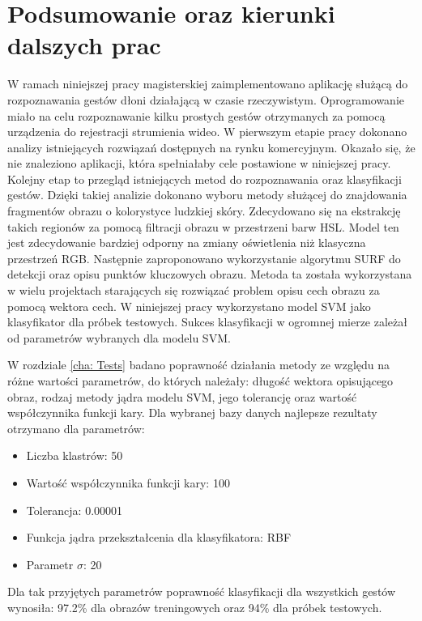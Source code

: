 \chapter{Podsumowanie oraz kierunki dalszych prac}
W ramach niniejszej pracy magisterskiej zaimplementowano aplikację służącą do rozpoznawania gestów dłoni działającą w czasie rzeczywistym. Oprogramowanie miało na celu rozpoznawanie kilku prostych gestów otrzymanych za pomocą urządzenia do rejestracji strumienia wideo. W pierwszym etapie pracy dokonano analizy istniejących rozwiązań dostępnych na rynku komercyjnym. Okazało się, że nie znaleziono aplikacji, która spełniałaby cele postawione w niniejszej pracy. Kolejny etap to przegląd istniejących metod do rozpoznawania oraz klasyfikacji gestów. Dzięki takiej analizie dokonano wyboru metody służącej do znajdowania fragmentów obrazu o kolorystyce ludzkiej skóry. Zdecydowano się na ekstrakcję takich regionów za pomocą filtracji obrazu w przestrzeni barw HSL. Model ten jest zdecydowanie bardziej odporny na zmiany oświetlenia niż klasyczna przestrzeń RGB. Następnie zaproponowano wykorzystanie algorytmu SURF do detekcji oraz opisu punktów kluczowych obrazu. Metoda ta została wykorzystana w wielu projektach starających się rozwiązać problem opisu cech obrazu za pomocą wektora cech. W niniejszej pracy wykorzystano model SVM jako klasyfikator dla próbek testowych. Sukces klasyfikacji w ogromnej mierze zależał od parametrów  wybranych dla modelu SVM.

W rozdziale \ref{cha: Tests} badano poprawność działania metody ze względu na różne wartości parametrów, do których należały: długość wektora opisującego obraz, rodzaj metody jądra modelu SVM, jego tolerancję oraz wartość współczynnika funkcji kary. Dla wybranej bazy danych najlepsze rezultaty otrzymano dla parametrów: 
\begin{itemize}
	\item Liczba klastrów: 50
	\item Wartość współczynnika funkcji kary: 100
	\item Tolerancja: 0.00001
	\item Funkcja jądra przekształcenia dla klasyfikatora: RBF
	\item Parametr $\sigma$: 20	
\end{itemize}
Dla tak przyjętych parametrów poprawność klasyfikacji dla wszystkich gestów wynosiła: 97.2\% dla obrazów treningowych oraz 94\% dla próbek testowych.

